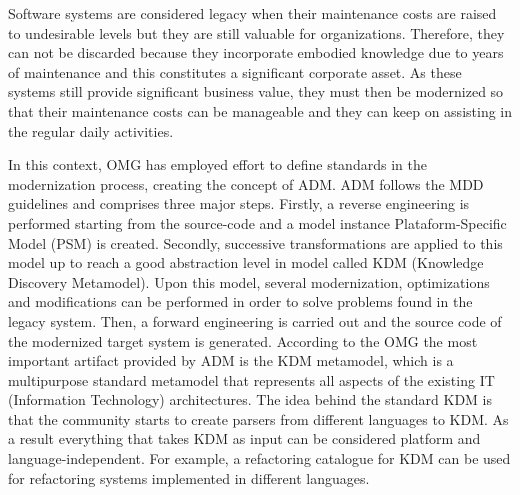 Software systems are considered legacy when their maintenance costs are raised to undesirable levels but they are still valuable for organizations. Therefore, they can not be discarded because they incorporate embodied knowledge due to years of maintenance and this constitutes a significant corporate asset. As these systems still provide significant business value, they must then be modernized so that their maintenance costs can be manageable and they can keep on assisting in the regular daily activities. 


In this context, OMG has employed effort to define standards in the modernization process, creating the concept of ADM. ADM follows the MDD~\cite{5440163} guidelines and comprises three major steps. Firstly, a reverse engineering is performed starting from the source-code and a model instance Plataform-Specific Model (PSM) is created. Secondly, successive transformations are applied to this model up to reach a good abstraction level in model called KDM (Knowledge Discovery Metamodel). Upon this model, several modernization, optimizations and modifications can be performed in order to solve problems found in the legacy system. Then, a forward engineering is carried out and the source code of the modernized target system is generated. According to the OMG the most important artifact provided by ADM is the KDM metamodel, which is a multipurpose standard metamodel that represents all aspects of the existing IT (Information  Technology) architectures. The idea behind the standard KDM is that the community starts to create parsers from different languages to KDM. As a result everything that takes KDM as input can be considered platform and language-independent. For example, a refactoring catalogue for KDM can be used for refactoring systems implemented in different languages. 

